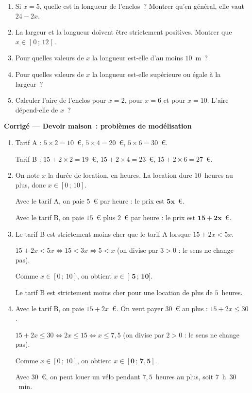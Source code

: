 \documentclass[12pt,a4paper]{article}
\newcommand{\exercice}[1]{%
  \vspace{0.5em}
  \noindent\exobox{Exercice #1}\par
  \vspace{0.6em}
}
\newcommand{\res}[1]{\ensuremath{\mathbf{#1}}}
\begin{document}
\begin{enumerate}[itemsep=1em, topsep=0.8em]
	\item Si $x = 5$, quelle est la longueur de l'enclos~? Montrer qu'en général, elle vaut $24 - 2x$.
	\item La largeur et la longueur doivent être strictement positives. Montrer que $x \in \mathopen{]}0\,;\,12\mathclose{[}$.
	\item Pour quelles valeurs de $x$ la longueur est-elle d'au moins $10$~m~?
	\item Pour quelles valeurs de $x$ la longueur est-elle supérieure ou égale à la largeur~?
	\item Calculer l'aire de l'enclos pour $x = 2$, pour $x = 6$ et pour $x = 10$. L'aire dépend-elle de $x$~?
\end{enumerate}

\vfill

\ifdefined\ELEVE\else
\clearpage

\begin{center}
  {\Large\bfseries Corrigé --- Devoir maison~: problèmes de modélisation}
\end{center}

\exercice{1}
\begin{enumerate}
	\item Tarif A : $5\times 2=10$~€, $5\times 4=20$~€, $5\times 6=30$~€.

	Tarif B : $15+2\times 2=19$~€, $15+2\times 4=23$~€, $15+2\times 6=27$~€.
	\item On note $x$ la durée de location, en heures. La location dure $10$~heures au plus, donc $x\in[0\,;\,10]$.

	Avec le tarif A, on paie $5$~€ par heure : le prix est \res{5x}~€.

	Avec le tarif B, on paie $15$~€ plus $2$~€ par heure : le prix est \res{15+2x}~€.
	\item Le tarif B est strictement moins cher que le tarif A lorsque $15+2x<5x$.

	$15+2x<5x \iff 15<3x \iff 5<x$ \quad (on divise par $3>0$ : le sens ne change pas).

	Comme $x\in[0\,;\,10]$, on obtient $x\in\res{\mathopen{]}5\,;\,10]}$.

	Le tarif B est strictement moins cher pour une location de plus de $5$~heures.
	\item Avec le tarif B, on paie $15+2x$~€. On veut payer $30$~€ au plus : $15+2x\leqslant 30$.

	$15+2x\leqslant 30 \iff 2x\leqslant 15 \iff x\leqslant 7{,}5$ \quad (on divise par $2>0$ : le sens ne change pas).

	Comme $x\in[0\,;\,10]$, on obtient $x\in\res{[0\,;\,7{,}5]}$.

	Avec $30$~€, on peut louer un vélo pendant $7{,}5$~heures au plus, soit $7$~h~$30$~min.
\end{enumerate}
\end{document}
